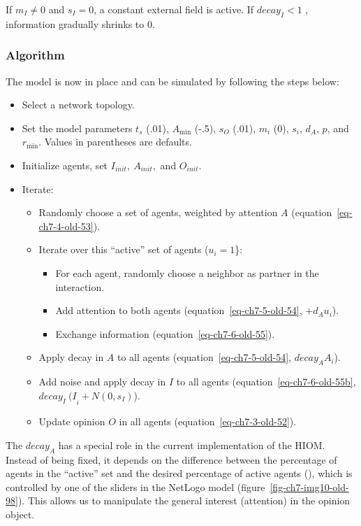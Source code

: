 \documentclass[
  a4paper,
  DIV=11,
  numbers=noendperiod,
  oneside]{scrreprt}
\begin{document}
If \(m_{I} \neq 0\) and \(s_{I} = 0\), a constant external field is
active. If \(decay_I < 1\) , information gradually shrinks to 0.

\subsubsection{Algorithm}\label{sec-Algorithm}

The model is now in place and can be simulated by following the steps
below:

\begin{itemize}
\item
  Select a network topology.
\item
  Set the model parameters \(t_{s}\) (.01), \(A_{\min}\) (-.5),
  \(s_{O}\) (.01), \(m_{i}\) (0), \(s_{i}\), \(d_{A}\), \(p\), and
  \(r_{\min}\). Values in parentheses are defaults.
\item
  Initialize agents, set \(I_{init},\ A_{init},\) and \(O_{init}\).
\item
  Iterate:

  \begin{itemize}
  \item
    Randomly choose a set of agents, weighted by attention \(A\)
    (equation~\ref{eq-ch7-4-old-53}).
  \item
    Iterate over this ``active'' set of agents (\(u_{i} = 1\)\}:

    \begin{itemize}
    \item
      For each agent, randomly choose a neighbor as partner in the
      interaction.
    \item
      Add attention to both agents (equation~\ref{eq-ch7-5-old-54},
      \(+ d_{A}u_{i}\)).
    \item
      Exchange information (equation~\ref{eq-ch7-6-old-55}).
    \end{itemize}
  \item
    Apply decay in \(A\) to all agents (equation~\ref{eq-ch7-5-old-54},
    \({decay}_{A}A_{i}\)).
  \item
    Add noise and apply decay in \(I\) to all agents
    (equation~\ref{eq-ch7-6-old-55b},
    \({decay_{I}\ (I}_{i} + Ν(0,s_{I})\)).
  \item
    Update opinion \(O\) in all agents (equation~\ref{eq-ch7-3-old-52}).
  \end{itemize}
\end{itemize}

The \({decay}_{A}\) has a special role in the current implementation of
the HIOM. Instead of being fixed, it depends on the difference between
the percentage of agents in the ``active'' set and the desired
percentage of active agents (\(%
\)), which is controlled by one of the sliders in the NetLogo model
(figure~\ref{fig-ch7-img10-old-98}). This allows us to manipulate the
general interest (attention) in the opinion object.
\end{document}
